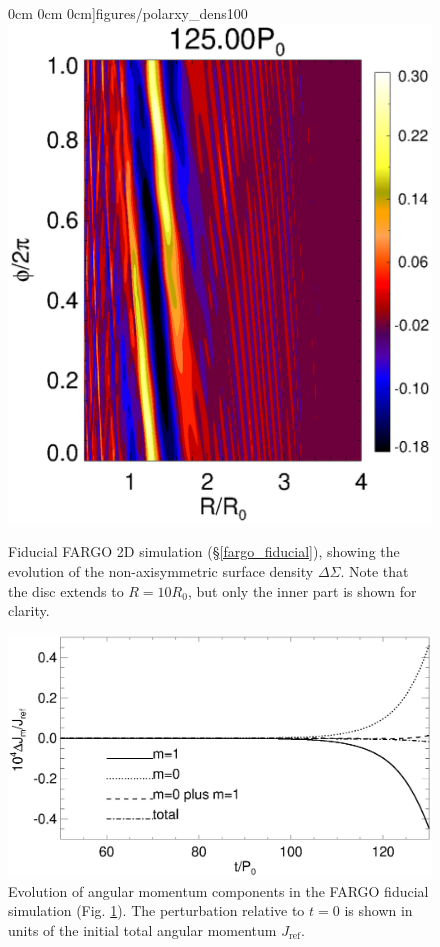 \begin{figure}
  0cm 0cm
  0cm]{figures/polarxy_dens100}\includegraphics[scale=0.27,clip=true,trim=2.26cm
  0cm 0cm 0cm]{figures/polarxy_dens125} 
  \caption{Fiducial FARGO 2D simulation (\S\ref{fargo_fiducial}),
    showing the evolution of the non-axisymmetric surface density
    $\Delta\Sigma$. Note that the disc extends to $R=10R_0$, but only
    the inner part is shown for clarity. \label{fargo_2d}} 
\end{figure}

\begin{figure}
  \includegraphics[width=\linewidth]{figures/nonaxi_evol_ang_fargo}
  \caption{Evolution of angular momentum components in the FARGO
    fiducial simulation (Fig. \ref{fargo_2d}). The perturbation
    relative to $t=0$ is shown in units of the initial total angular
    momentum $J_\mathrm{ref}$.\label{fargo_2d_angmom}} 
\end{figure}

